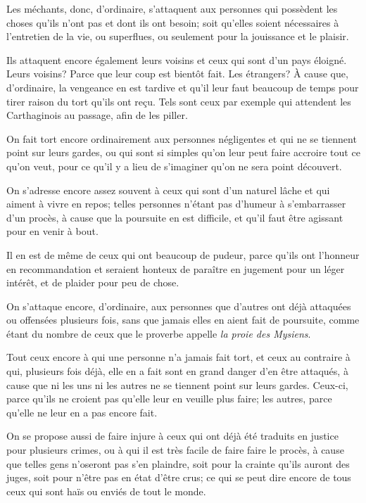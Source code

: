 Les méchants, donc, d'ordinaire, s'attaquent aux personnes qui possèdent les choses qu'ils n'ont pas et dont ils
ont besoin; soit qu'elles soient nécessaires à l'entretien de la vie, ou superflues, ou seulement pour la jouissance
et le plaisir.

Ils attaquent encore également leurs voisins et ceux qui sont d'un pays éloigné. Leurs voisins? Parce que leur coup
est bientôt fait. Les étrangers? À cause que, d'ordinaire, la vengeance en est tardive et qu'il leur faut beaucoup de
temps pour tirer raison du tort qu'ils ont reçu. Tels sont ceux par exemple qui attendent les Carthaginois au passage,
afin de les piller.

On fait tort encore ordinairement aux personnes négligentes et qui ne se tiennent point sur leurs gardes, ou qui sont
si simples qu'on leur peut faire accroire tout ce qu'on veut, pour ce qu'il y a lieu de s'imaginer qu'on ne sera point
découvert.

On s'adresse encore assez souvent à ceux qui sont d'un naturel lâche et qui aiment à vivre en repos; telles personnes
n'étant pas d'humeur à s'embarrasser d'un procès, à cause que la poursuite en est difficile, et qu'il faut être agissant
pour en venir à bout. 

Il en est de même de ceux qui ont beaucoup de pudeur, parce qu'ils ont l'honneur en recommandation et seraient
honteux de paraître en jugement pour un léger intérêt, et de plaider pour peu de chose.

On s'attaque encore, d'ordinaire, aux personnes que d'autres ont déjà attaquées ou offensées plusieurs fois, sans
que jamais elles en aient fait de poursuite, comme étant du nombre de ceux que le proverbe appelle \emph{la proie
des Mysiens}.

Tout ceux encore à qui une personne n'a jamais fait tort, et ceux au contraire à qui, plusieurs fois déjà, elle en
a fait sont en grand danger d'en être attaqués, à cause que ni les uns ni les autres ne se tiennent point sur leurs
gardes. Ceux-ci, parce qu'ils ne croient pas qu'elle leur en veuille plus faire; les autres, parce qu'elle ne leur
en a pas encore fait.

On se propose aussi de faire injure à ceux qui ont déjà été traduits en justice pour plusieurs crimes, ou à qui il
est très facile de faire faire le procès, à cause que telles gens n'oseront pas s'en plaindre, soit pour la crainte
qu'ils auront des juges, soit pour n'être pas en état d'être crus; ce qui se peut dire encore de tous ceux qui sont
haïs ou enviés de tout le monde.

